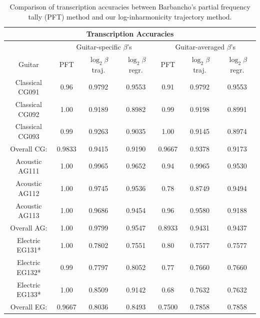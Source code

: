 \documentclass[12pt]{cmuthesis}
\begin{document}


\begin{table}[!htbp]
\begin{center}
\begin{tabular} {||c||c|c|c||c|c|c||}
\hline
\multicolumn{7}{|c|}{\bf{Transcription Accuracies}} \\
\hline
 & \multicolumn{3}{|c|}{Guitar-specific $\beta$'s} & \multicolumn{3}{|c|}{Guitar-averaged $\beta$'s}\\
\hline
Guitar & PFT & $\log_{2}\beta$ traj. & $\log_{2}\beta$ regr. & PFT & $\log_{2}\beta$ traj. & $\log_{2}\beta$ regr.\\
\hline
\hline
Classical CG091 & 0.96 & 0.9792 & 0.9553 & 0.91 & 0.9792 & 0.9553\\
\hline
Classical CG092 & 1.00 & 0.9189 & 0.8982 & 0.99 & 0.9198 &  0.8991\\
\hline
Classical CG093 & 0.99 & 0.9263 & 0.9035 & 1.00 & 0.9145 & 0.8974\\
\hline
Overall CG: & 0.9833 & 0.9415 & 0.9190 & 0.9667 & 0.9378 & 0.9173\\
\hline
\hline
Acoustic AG111 & 1.00 & 0.9965 & 0.9652 & 0.94 & 0.9965 & 0.9530 \\
\hline
Acoustic AG112 & 1.00 & 0.9745 & 0.9536 & 0.78 & 0.8749 & 0.9494 \\
\hline
Acoustic AG113  & 1.00 & 0.9686 & 0.9454 & 0.96 & 0.9580 & 0.9188\\
\hline
Overall AG: & 1.00 & 0.9799 & 0.9547 & 0.8933 & 0.9431 & 0.9437 \\
\hline
\hline
Electric EG131* & 1.00 & 0.7802 & 0.7551 & 0.80 & 0.7577 & 0.7577 \\
\hline
Electric EG132* & 0.99 & 0.7797 & 0.8052 & 0.77 & 0.7660 & 0.7660 \\
\hline
Electric EG133* & 1.00 & 0.8509 & 0.9142 & 0.68 & 0.7632  & 0.7632 \\
\hline
Overall EG: & 0.9667 & 0.8036 & 0.8493 & 0.7500 & 0.7858 & 0.7858\\
\hline
\end{tabular}
\caption{Comparison of transcription accuracies between Barbancho's partial frequency tally (PFT) method and our log-inharmonicity trajectory method.}
\label{tab:overall-results-RWC}
\end{center}
\end{table}
\end{document}
